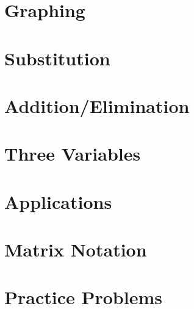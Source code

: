\section{Graphing}

\newpage

\section{Substitution}

\newpage

\section{Addition/Elimination}

\newpage

\section{Three Variables}

\newpage

\section{Applications}

\newpage

\section{Matrix Notation}

\newpage

\section{Practice Problems}

\newpage
\closegraphsfile